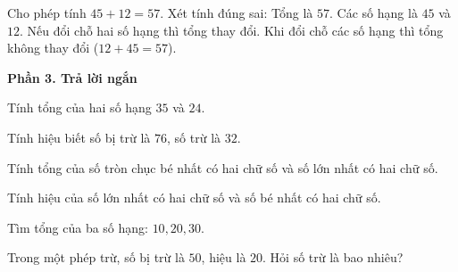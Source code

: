 \begin{ex} %
Cho phép tính $45 + 12 = 57$. Xét tính đúng sai:
\choiceTF
{\True Tổng là $57$.}
{\True Các số hạng là $45$ và $12$.}
{Nếu đổi chỗ hai số hạng thì tổng thay đổi.}
{\True Khi đổi chỗ các số hạng thì tổng không thay đổi ($12 + 45 = 57$).}
\end{ex}

\textbf{Phần 3. Trả lời ngắn}

\begin{ex} %
Tính tổng của hai số hạng $35$ và $24$.
\end{ex}

\begin{ex} %
Tính hiệu biết số bị trừ là $76$, số trừ là $32$.
\end{ex}

\begin{ex} %
Tính tổng của số tròn chục bé nhất có hai chữ số và số lớn nhất có hai chữ số.
\end{ex}

\begin{ex} %
Tính hiệu của số lớn nhất có hai chữ số và số bé nhất có hai chữ số.
\end{ex}

\begin{ex} %
Tìm tổng của ba số hạng: $10, 20, 30$.
\end{ex}

\begin{ex} %
Trong một phép trừ, số bị trừ là $50$, hiệu là $20$. Hỏi số trừ là bao nhiêu?
\end{ex}
